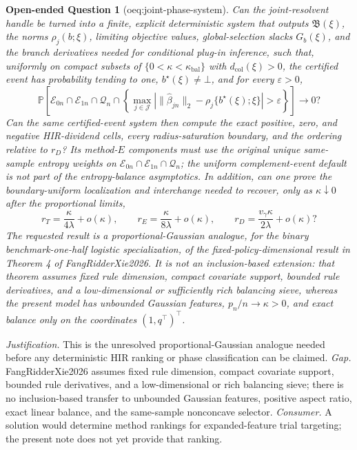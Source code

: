 \documentclass{article}
\newtheorem{openendedquestion}{Open-ended Question}
\begin{document}
\begin{openendedquestion}[oeq:joint-phase-system]\label{oeq:joint-phase-system}
Can the joint-resolvent handle be turned into a finite, explicit deterministic system that outputs \(\mathfrak B(\xi)\), the norms \(\rho_j(b;\xi)\), limiting objective values, global-selection slacks \(G_b(\xi)\), and the branch derivatives needed for conditional plug-in inference, such that, uniformly on compact subsets of \(\{0<\kappa<\kappa_{\mathrm{bal}}\}\) with \(d_{\mathrm{col}}(\xi)>0\), the certified event has probability tending to one, \(b^\star(\xi)\ne\bot\), and for every \(\varepsilon>0\),
\[
 \mathbb P\!\left[
 \mathcal E_{0n}\cap\mathcal E_{1n}\cap\mathcal Q_n\cap
 \left\{\max_{j\in\mathcal J}
 \left|\|\widehat\beta_{jn}\|_2-
 \rho_j\{b^\star(\xi);\xi\}\right|>\varepsilon\right\}
 \right]\longrightarrow0?
\]
Can the same certified-event system then compute the exact positive, zero, and negative HIR-dividend cells, every radius-saturation boundary, and the ordering relative to \(r_D\)?  Its method-\(E\) components must use the original unique same-sample entropy weights on \(\mathcal E_{0n}\cap\mathcal E_{1n}\cap\mathcal Q_n\); the uniform complement-event default is not part of the entropy-balance asymptotics.  In addition, can one prove the boundary-uniform localization and interchange needed to recover, only as \(\kappa\downarrow0\) after the proportional limits,
\[
 r_T=\frac{\kappa}{4\lambda}+o(\kappa),
 \qquad
 r_E=\frac{\kappa}{8\lambda}+o(\kappa),
 \qquad
 r_D=\frac{v_\gamma\kappa}{2\lambda}+o(\kappa)?
\]
The requested result is a proportional-Gaussian analogue, for the binary benchmark-one-half logistic specialization, of the fixed-policy-dimensional result in Theorem 4 of FangRidderXie2026.  It is not an inclusion-based extension: that theorem assumes fixed rule dimension, compact covariate support, bounded rule derivatives, and a low-dimensional or sufficiently rich balancing sieve, whereas the present model has unbounded Gaussian features, \(p_n/n\to\kappa>0\), and exact balance only on the coordinates \((1,q^\top)^\top\).
\end{openendedquestion}
\par\smallskip\noindent \textit{Justification.} This is the unresolved proportional-Gaussian analogue needed before any deterministic HIR ranking or phase classification can be claimed. \textit{Gap.} FangRidderXie2026 assumes fixed rule dimension, compact covariate support, bounded rule derivatives, and a low-dimensional or rich balancing sieve; there is no inclusion-based transfer to unbounded Gaussian features, positive aspect ratio, exact linear balance, and the same-sample nonconcave selector. \textit{Consumer.} A solution would determine method rankings for expanded-feature trial targeting; the present note does not yet provide that ranking.
\end{document}

